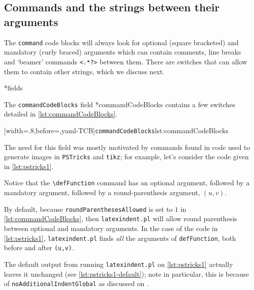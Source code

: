 \subsection{Commands and the strings between their arguments}\label{subsec:commands-string-between} The \texttt{command} code blocks will
 always look for optional (square bracketed) and mandatory (curly braced) arguments which
 can contain comments, line breaks and `beamer' commands \lstinline!<.*?>! between them.
 There are switches that can allow them to contain other strings, which we discuss next.

*{fields}

 The \texttt{commandCodeBlocks} field *{commandCodeBlocks} contains a
 few switches detailed in \cref{lst:commandCodeBlocks}.%

 [width=.8\linewidth,before=\centering,yaml-TCB]{\texttt{commandCodeBlocks}}{lst:commandCodeBlocks}


 The need for this field was mostly motivated by commands found in code used to generate
 images in \texttt{PSTricks} and \texttt{tikz}; for example, let's consider the code given
 in \cref{lst:pstricks1}.

 \begin{minipage}{.45\textwidth}
 \end{minipage}
 \hfill
 \begin{minipage}{.45\textwidth}
 \end{minipage}

 Notice that the \lstinline!\defFunction! command has an optional argument, followed by a
 mandatory argument, followed by a round-parenthesis argument, $(u,v)$.

 By default, because \texttt{roundParenthesesAllowed} is set to $1$ in
 \cref{lst:commandCodeBlocks}, then \texttt{latexindent.pl} will allow round parenthesis
 between optional and mandatory arguments. In the case of the code in
 \cref{lst:pstricks1}, \texttt{latexindent.pl} finds \emph{all} the arguments of
 \lstinline!defFunction!, both before and after \lstinline!(u,v)!.

 The default output from running \texttt{latexindent.pl} on \cref{lst:pstricks1} actually
 leaves it unchanged (see \cref{lst:pstricks1-default}); note in particular, this is
 because of \texttt{noAdditionalIndentGlobal} as discussed on
 .


